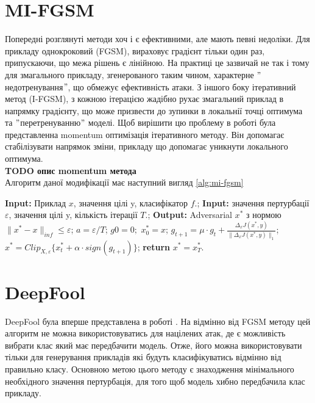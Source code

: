 \documentclass[a4paper,12pt]{extreport}
\renewcommand{\algorithmicrequire}{\textbf{Input: }}
\renewcommand{\algorithmicensure}{\textbf{Output: }}
\newcommand{\algorithmreturn}{\textbf{return }}
\begin{document}
	\section{MI-FGSM}	
	Попередні розглянуті методи хоч і є ефективними, але мають певні недоліки.
	Для прикладу однокроковий (FGSM), вираховує градієнт тільки один раз, припускаючи, що межа рішень є лінійною. На практиці це зазвичай не так і тому для змагального прикладу, згенерованого таким чином, характерне $"$недотренування$"$, що обмежує ефективність атаки. З іншого боку ітеративний метод (I-FGSM), з кожною ітерацією жадібно рухає змагальний приклад в напрямку градієнту, що може призвести до зупинки в локальнії точці оптимума та $"$перетренуванню$"$ моделі. Щоб вирішити цю проблему в роботі \textcite{dong2017boosting} була представленна momentum оптимізація ітеративного методу. Він допомагає стабілізувати напрямок зміни, прикладу що допомагає уникнути локального оптимума.
	\\{\textbf{TODO опис momentum метода}}  \\
	Алгоритм даної модифікації має наступний вигляд \ref{alg:mi-fgsm}	
	\begin{algorithm}
		\caption{$MI-FGSM$}
		\label{alg:mi-fgsm}
		\begin{algorithmic}[1]
			\State \algorithmicrequire{Приклад $x$, значення цілі y, класифікатор $f$.};
			\State \algorithmicrequire{значення пертурбації $\varepsilon$, значення цілі y, кількість ітерації $T$.};
			\State \algorithmicensure{ Adversarial $x^{*}$ з нормою $\|x^{*} - x\|_{inf} \leq \varepsilon $};
			\State $a = \varepsilon / T$;
			\State $g0 = 0;$ $x^{*}_0 = x$;
			\State $g_{t+1} = \mu \cdot g_t + \frac{\Delta_x J(x^{*}, y)}{\|\Delta_x J(x^{*}, y)\|_1}$;
			\State $x^{*} = Clip_{X, \varepsilon} \big\{ x^{*}_{t} + \alpha \cdot sign(g_{t+1}) \big\}$;
			\EndFor
			\State \algorithmreturn{$x^{*} = x^{*}_{T}$}.
		\end{algorithmic}
	\end{algorithm}
	
	\newpage
	\section{DeepFool}
	DeepFool була вперше представлена в роботі \textcite{moosavidezfooli2015deepfool}. На відмінно від FGSM методу цей алгоритм не можна використовуватись для націлених атак, де є можливість вибрати клас який має передбачити модель. Отже, його можна використовувати тільки для генерування прикладів які будуть класифікуватись відмінно від правильно класу. Основною метою цього методу є знаходження мінімального необхідного значення пертурбація, для того щоб модель хибно передбачила клас прикладу.
	
\end{document}
